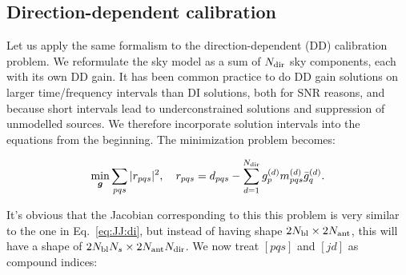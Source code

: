 \documentclass[useAMS,usenatbib]{mn2e}
\newcommand{\mat}[1]{{\bmath{#1}}}
\newcommand{\MM}{\mat{M}}
\newcommand{\GG}{\mat{G}}
\numberwithin{equation}{section} %
\providecommand{\DIFaddend}{} %
\providecommand{\DIFdelbegin}{} %
\providecommand{\DIFdelend}{} %
\begin{document}
\DIFaddend \subsection{Direction-dependent calibration}
\label{sec:unpol:DD}

Let us apply the same formalism to the direction-dependent (DD) calibration problem. 
We reformulate the sky model as a sum of $N_\mathrm{dir}$ sky components, each with its own DD 
gain. It has been common practice to do DD gain solutions on larger time/frequency intervals than DI 
solutions, both for SNR reasons, and because short intervals lead to underconstrained solutions
and suppression of unmodelled sources. We therefore incorporate solution intervals into the
equations from the beginning. The minimization problem becomes:
\DIFdelbegin %


\DIFdelend \begin{equation}
\label{eq:cal:dd:unpol}
\min_{\bmath{g}}\sum_{pqs}|r_{pqs}|^2, ~~~
r_{pqs} = d_{pqs} - \sum_{d=1}^{\Nd} \ggd_p \mmd_{pqs} \ggdH_q.
\end{equation}
\DIFdelbegin %

\DIFdelend It's obvious that the Jacobian corresponding to this  this problem is very similar to the one 
in Eq.~\ref{eq:JJ:di}, but instead of having shape $2N_\mathrm{bl}\times2N_\mathrm{ant}$, this will have a 
shape of $2N_\mathrm{bl}N_s\times 2N_\mathrm{ant}N_\mathrm{dir}$. We now treat $[pqs]$ and $[jd]$ as compound indices: 
\DIFdelbegin %
\end{document}
